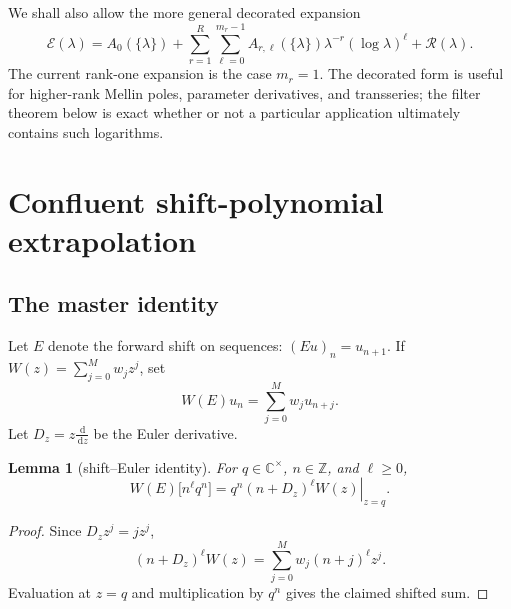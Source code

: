 \documentclass[11pt,oneside]{article}
\numberwithin{equation}{section}
\newtheorem{lemma}[theorem]{Lemma}
\theoremstyle{definition}
\theoremstyle{remark}
\newcommand{\C}{\mathbb C}
\newcommand{\Z}{\mathbb Z}
\newcommand{\dd}{\,\mathrm d}
\begin{document}
We shall also allow the more general decorated expansion
\begin{equation}
 \mathscr E(\lambda)
 =A_0(\{\lambda\})
 +\sum_{r=1}^{R}\sum_{\ell=0}^{m_r-1}
 A_{r,\ell}(\{\lambda\})\lambda^{-r}(\log\lambda)^\ell
 +\mathcal R(\lambda).
 \label{eq:decorated-expansion}
\end{equation}
The current rank-one expansion is the case $m_r=1$.  The decorated form is useful for
higher-rank Mellin poles, parameter derivatives, and transseries; the filter theorem below
is exact whether or not a particular application ultimately contains such logarithms.

\section{Confluent shift-polynomial extrapolation}
\label{sec:confluent}

\subsection{The master identity}

Let $E$ denote the forward shift on sequences: $(Eu)_n=u_{n+1}$.  If
$W(z)=\sum_{j=0}^{M}w_jz^j$, set
\[
 W(E)u_n=\sum_{j=0}^{M}w_ju_{n+j}.
\]
Let $D_z=z\frac{\dd}{\dd z}$ be the Euler derivative.

\begin{lemma}[shift--Euler identity]
\label{lem:shift-euler}
For $q\in\C^\times$, $n\in\Z$, and $\ell\ge0$,
\begin{equation}
 W(E)\bigl[n^\ell q^n\bigr]
 =q^n\left.(n+D_z)^\ell W(z)\right|_{z=q}.
 \label{eq:shift-euler}
\end{equation}
\end{lemma}

\begin{proof}
Since $D_zz^j=jz^j$,
\[
 (n+D_z)^\ell W(z)
 =\sum_{j=0}^{M}w_j(n+j)^\ell z^j.
\]
Evaluation at $z=q$ and multiplication by $q^n$ gives the claimed shifted sum.
\end{proof}
\end{document}
